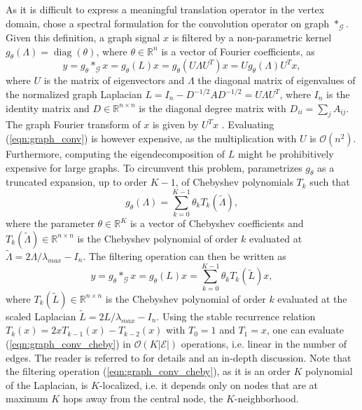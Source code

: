 \documentclass{article} %
\DeclareMathOperator*{\diag}{diag}
\newcommand{\R}{\mathbb{R}}
\newcommand{\bO}{\mathcal{O}}
\newcommand{\G}{\mathcal{G}}
\newcommand{\E}{\mathcal{E}}
\newcommand{\eqnref}[1]{(\ref{eqn:#1})}
\begin{document}
As it is difficult to express a meaningful translation operator in the vertex
domain, \citet{graphcnn} chose a spectral formulation for the convolution
operator on graph $\ast_\G$. Given this definition, a graph signal $x$ is
filtered by a non-parametric kernel $g_\theta(\Lambda) = \diag(\theta)$, where
$\theta \in \R^n$ is a vector of Fourier coefficients, as
\begin{equation} \label{eqn:graph_conv}
	y = g_\theta \ast_\G x = g_\theta(L) x = g_\theta(U \Lambda U^T) x = U g_\theta(\Lambda) U^T x,
\end{equation}
where $U$ is the matrix of eigenvectors and $\Lambda$ the diagonal matrix of
eigenvalues of the normalized graph Laplacian $L = I_n - D^{-1/2} A D^{-1/2} =
U \Lambda U^T$, where $I_n$ is the identity matrix and $D \in \R^{n \times n}$
is the diagonal degree matrix with $D_{ii} = \sum_j A_{ij}$. The graph Fourier
transform of $x$ is given by $U^Tx$ \citep{gsp}. Evaluating \eqnref{graph_conv}
is however expensive, as the multiplication with $U$ is $\bO(n^2)$. Furthermore,
computing the eigendecomposition of $L$ might be prohibitively expensive for
large graphs. To circumvent this problem, \cite{graphcnn} parametrizes $g_\theta$ as a truncated expansion, up to order $K-1$, of Chebyshev polynomials $T_k$
such that
\begin{equation} \label{eq:filt_cheby}
	g_\theta(\Lambda) = \sum_{k=0}^{K-1} \theta_k T_k(\tilde{\Lambda}),
\end{equation}
where the parameter $\theta \in \R^K$ is a vector of Chebyshev coefficients and
$T_k(\tilde{\Lambda}) \in \R^{n \times n}$ is the Chebyshev polynomial of order
$k$ evaluated at $\tilde{\Lambda} = 2 \Lambda / \lambda_{max} - I_n$.
The filtering operation can then be written as
\begin{equation} \label{eqn:graph_conv_cheby}
	y = g_\theta \ast_\G x = g_\theta(L) x = \sum_{k=0}^{K-1} \theta_k T_k(\tilde{L}) x,
\end{equation}
where $T_k(\tilde{L}) \in \R^{n \times n}$ is the Chebyshev polynomial of order
$k$ evaluated at the scaled Laplacian $\tilde{L} = 2 L / \lambda_{max} - I_n$.
Using the stable recurrence relation $T_k(x) = 2x T_{k-1}(x) - T_{k-2}(x)$ with
$T_0 = 1$ and $T_1 = x$, one can evaluate \eqnref{graph_conv_cheby} in
$\bO(K|\E|)$ operations, i.e. linear in the number of edges. The reader is
referred to \cite{graphcnn} for details and an in-depth discussion. Note that
the filtering operation \eqnref{graph_conv_cheby}, as it is an order $K$
polynomial of the Laplacian, is $K$-localized, i.e. it depends only on nodes
that are at maximum $K$ hops away from the central node, the $K$-neighborhood.
\end{document}
